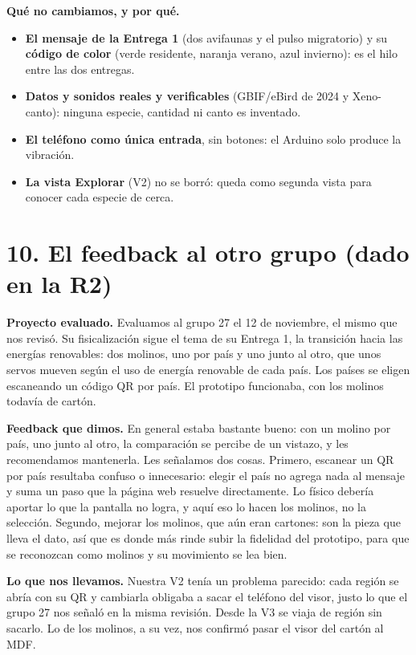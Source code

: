 \documentclass[11pt,a4paper]{article}
\begin{document}
\textbf{Qué no cambiamos, y por qué.}

\begin{itemize}
\item \textbf{El mensaje de la Entrega 1} (dos avifaunas y el pulso migratorio) y su \textbf{código de color} (verde residente, naranja verano, azul invierno): es el hilo entre las dos entregas.
\item \textbf{Datos y sonidos reales y verificables} (GBIF/eBird de 2024 y Xeno-canto): ninguna especie, cantidad ni canto es inventado.
\item \textbf{El teléfono como única entrada}, sin botones: el Arduino solo produce la vibración.
\item \textbf{La vista Explorar} (V2) no se borró: queda como segunda vista para conocer cada especie de cerca.
\end{itemize}
\section*{10. El feedback al otro grupo (dado en la R2)}
\textbf{Proyecto evaluado.} Evaluamos al grupo 27 el 12 de noviembre, el mismo que nos revisó. Su fisicalización sigue el tema de su Entrega 1, la transición hacia las energías renovables: dos molinos, uno por país y uno junto al otro, que unos servos mueven según el uso de energía renovable de cada país. Los países se eligen escaneando un código QR por país. El prototipo funcionaba, con los molinos todavía de cartón.

\textbf{Feedback que dimos.} En general estaba bastante bueno: con un molino por país, uno junto al otro, la comparación se percibe de un vistazo, y les recomendamos mantenerla. Les señalamos dos cosas. Primero, escanear un QR por país resultaba confuso o innecesario: elegir el país no agrega nada al mensaje y suma un paso que la página web resuelve directamente. Lo físico debería aportar lo que la pantalla no logra, y aquí eso lo hacen los molinos, no la selección. Segundo, mejorar los molinos, que aún eran cartones: son la pieza que lleva el dato, así que es donde más rinde subir la fidelidad del prototipo, para que se reconozcan como molinos y su movimiento se lea bien.

\textbf{Lo que nos llevamos.} Nuestra V2 tenía un problema parecido: cada región se abría con su QR y cambiarla obligaba a sacar el teléfono del visor, justo lo que el grupo 27 nos señaló en la misma revisión. Desde la V3 se viaja de región sin sacarlo. Lo de los molinos, a su vez, nos confirmó pasar el visor del cartón al MDF.
\end{document}
